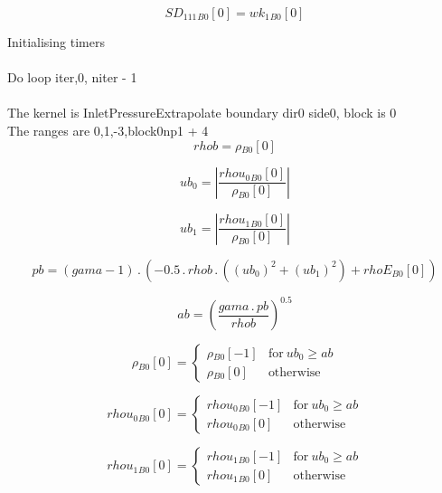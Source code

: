 \documentclass{article}
\begin{document}
\begin{dmath}{SD_{111}{_{B0}}}[{0}] = {wk_{1}{_{B0}}}[{0}]\end{dmath}

\noindent Initialising timers\\
\\\noindent Do loop iter,0, niter - 1\\
\\\noindent The kernel is InletPressureExtrapolate boundary dir0 side0, block is 0\\\noindent The ranges are 0,1,-3,block0np1 + 4\\\begin{dmath}rhob = {\rho{_{B0}}}[{0}]\end{dmath}

\begin{dmath}ub_{0} = \left|{\frac{{rhou_{0}{_{B0}}}[{0}]}{{\rho{_{B0}}}[{0}]}}\right|\end{dmath}

\begin{dmath}ub_{1} = \left|{\frac{{rhou_{1}{_{B0}}}[{0}]}{{\rho{_{B0}}}[{0}]}}\right|\end{dmath}

\begin{dmath}pb = \left(gama - 1\right) \,.\, \left(- 0.5 \,.\, rhob \,.\, \left(\left(ub_{0} \right)^{2} + \left(ub_{1} \right)^{2}\right) + {rhoE{_{B0}}}[{0}]\right)\end{dmath}

\begin{dmath}ab = \left(\frac{gama \,.\, pb}{rhob} \right)^{0.5}\end{dmath}

\begin{dmath}{\rho{_{B0}}}[{0}] = \begin{cases} {\rho{_{B0}}}[{-1}] & \text{for}\: ub_{0} \geq ab \\{\rho{_{B0}}}[{0}] & \text{otherwise} \end{cases}\end{dmath}

\begin{dmath}{rhou_{0}{_{B0}}}[{0}] = \begin{cases} {rhou_{0}{_{B0}}}[{-1}] & \text{for}\: ub_{0} \geq ab \\{rhou_{0}{_{B0}}}[{0}] & \text{otherwise} \end{cases}\end{dmath}

\begin{dmath}{rhou_{1}{_{B0}}}[{0}] = \begin{cases} {rhou_{1}{_{B0}}}[{-1}] & \text{for}\: ub_{0} \geq ab \\{rhou_{1}{_{B0}}}[{0}] & \text{otherwise} \end{cases}\end{dmath}
\end{document}
